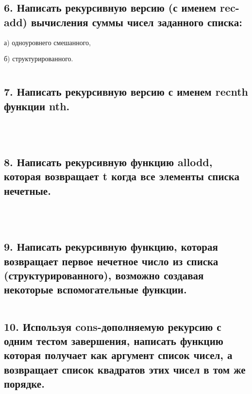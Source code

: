 \documentclass[12pt]{report}
\begin{document}
\subsection*{6. Написать рекурсивную версию (с именем rec-add) вычисления суммы чисел заданного
	списка:}

а) одноуровнего смешанного,

б) структурированного.

\begin{lstlisting}[label=6xd, caption=Решение задания №6, language=lisp]


\end{lstlisting}

\subsection*{7. Написать рекурсивную версию с именем recnth функции nth.}

\begin{lstlisting}[label=6xd, caption=Решение задания №7, language=lisp]	

	
\end{lstlisting}

\subsection*{8. Написать рекурсивную функцию allodd, которая возвращает t когда все элементы списка
	нечетные.}

\begin{lstlisting}[label=6xd, caption=Решение задания №8, language=lisp]
	
	
\end{lstlisting}

\subsection*{9. Написать рекурсивную функцию, которая возвращает первое нечетное число из списка
	(структурированного), возможно создавая некоторые вспомогательные функции.}

\begin{lstlisting}[label=6xd, caption=Решение задания №9, language=lisp]


\end{lstlisting}

\subsection*{10. Используя cons-дополняемую рекурсию с одним тестом завершения,
	написать функцию которая получает как аргумент список чисел, а возвращает список
	квадратов этих чисел в том же порядке.}

\begin{lstlisting}[label=6xd, caption=Решение задания №10, language=lisp]
	
	
\end{lstlisting}
\end{document}

